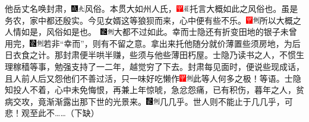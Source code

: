 他岳丈名唤封肃，{\includegraphics[width=3mm]{../Images/00005}\includegraphics[width=3mm]{../Images/00012}\footnotesize   风俗。}本贯大如州人氏，{\includegraphics[width=3mm]{../Images/00002}\includegraphics[width=3mm]{../Images/00010}\footnotesize  托言大概如此之风俗也。}虽是务农，家中都还殷实。今见女婿这等狼狈而来，心中便有些不乐。{{\includegraphics[width=3mm]{../Images/00002}\includegraphics[width=3mm]{../Images/00011}\footnotesize 所以大概之人情如是，风俗如是也。　}\includegraphics[width=3mm]{../Images/00006}\includegraphics[width=3mm]{../Images/00011}\footnotesize 大都不过如此。}幸而士隐还有折变田地的银子未曾用完，{\includegraphics[width=3mm]{../Images/00006}\includegraphics[width=3mm]{../Images/00011}\footnotesize 若非``幸而''，则有不留之意。}拿出来托他随分就价薄置些须房地，为后日衣食之计。那封肃便半哄半赚，些须与他些薄田朽屋。士隐乃读书之人，不惯生理稼穑等事，勉强支持了一二年，越觉穷了下去。封肃每见面时，便说些现成话，且人前人后又怨他们不善过活，只一味好吃懒作{\includegraphics[width=3mm]{../Images/00002}\includegraphics[width=3mm]{../Images/00011}\footnotesize 此等人何多之极！}等语。士隐知投人不着，心中未免悔恨，再兼上年惊唬，急忿怨痛，已有积伤，暮年之人，贫病交攻，竟渐渐露出那下世的光景来。{{\includegraphics[width=3mm]{../Images/00006}\includegraphics[width=3mm]{../Images/00011}\footnotesize 几几乎。世人则不能止于几几乎，可悲！观至此不\ldots{}\ldots{}}（下缺）}


